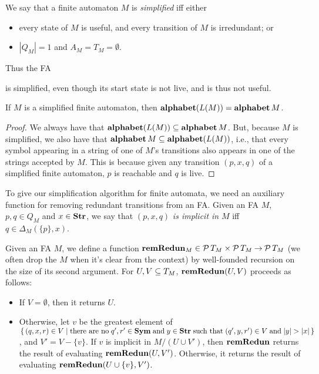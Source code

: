 We say that a finite automaton $M$ is \emph{simplified} iff either
%
%
%
\begin{itemize}
\item every state of $M$ is useful, and every transition of $M$
  is irredundant; or

\item $|Q_M|=1$ and $A_M = T_M = \emptyset$.
\end{itemize}
Thus the FA
\begin{center}

\end{center}
is simplified, even though its start state is not live, and is
thus not useful.

\begin{proposition}
\label{AlphabetSimplifiedFA}
If $M$ is a simplified finite automaton, then
$\mathbf{alphabet}(L(M))=\mathbf{alphabet}\,M$.
\end{proposition}

\begin{proof}
We always have that $\mathbf{alphabet}(L(M))\subseteq\mathbf{alphabet}\,M$.  But, because $M$
is simplified, we also have that $\mathbf{alphabet}\,M\subseteq\mathbf{alphabet}(L(M))$,
i.e., that every symbol appearing in a string of one of $M$'s
transitions also appears in one of the strings accepted by $M$.
This is because given any transition $(p,x,q)$ of a simplified
finite automaton, $p$ is reachable and $q$ is live.
\end{proof}

To give our simplification algorithm for finite automata, we need an
auxiliary function for removing redundant transitions from an FA.
Given an FA $M$, $p,q\in Q_M$ and $x\in\mathbf{Str}$, we say that $(p,x,q)$
\emph{is implicit in} $M$ iff $q\in\Delta_M(\{p\},x)$.

Given an FA $M$, we define a function
$\mathbf{remRedun}_M\in{\cal P} \,T_M\times{\cal P} \,T_M\mathbin{\to}{\cal P} \,T_M$ (we
often drop the $M$ when it's clear from the context) by well-founded
recursion on the size of its second argument.  For $U,V\subseteq T_M$,
$\mathbf{remRedun}(U, V)$ proceeds as follows:
\begin{itemize}
\item If $V=\emptyset$, then it returns $U$.

\item Otherwise, let $v$ be the greatest element of $\{ \, (q,x,r)\in
    V \mid \allowbreak\mbox{there are no}\allowbreak\; q',r'\in\mathbf{Sym} \;\allowbreak\mbox{and}\allowbreak\; y\in\mathbf{Str} \;\allowbreak\mbox{such
      that}\allowbreak\; (q',y,r')\in V \;\allowbreak\mbox{and}\allowbreak\; |y| > |x| \, \}$, and $V' = V - \{v\}$.
  If $v$ is implicit in $M/(U\cup V')$, then $\mathbf{remRedun}$
  returns the result of evaluating $\mathbf{remRedun}(U, V')$.  Otherwise, it
  returns the result of evaluating $\mathbf{remRedun}(U \cup \{v\}, V')$.
\end{itemize}

